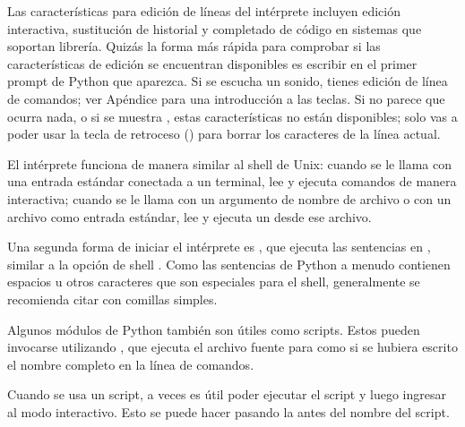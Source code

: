 \documentclass[a5paper,10pt,spanish]{sphinxmanual}
\begin{document}
\sphinxAtStartPar
Las características para edición de líneas del intérprete incluyen edición interactiva, sustitución de historial y completado de código en sistemas que soportan  librería. Quizás la forma más rápida para comprobar si las características de edición se encuentran disponibles es escribir  en el primer prompt de Python que aparezca. Si se escucha un sonido, tienes edición de línea de comandos; ver Apéndice {\hyperref[\detokenize{tutorial/interactive:tut-interacting}]{}} para una introducción a las teclas. Si no parece que ocurra nada, o si se muestra , estas características no están disponibles; solo vas a poder usar la tecla de retroceso () para borrar los caracteres de la línea actual.

\sphinxAtStartPar
El intérprete funciona de manera similar al shell de Unix: cuando se le llama con una entrada estándar conectada a un terminal, lee y ejecuta comandos de manera interactiva; cuando se le llama con un argumento de nombre de archivo o con un archivo como entrada estándar, lee y ejecuta un  desde ese archivo.

\sphinxAtStartPar
Una segunda forma de iniciar el intérprete es , que ejecuta las sentencias en , similar a la opción de shell  . Como las sentencias de Python a menudo contienen espacios u otros caracteres que son especiales para el shell, generalmente se recomienda citar  con comillas simples.

\sphinxAtStartPar
Algunos módulos de Python también son útiles como scripts. Estos pueden invocarse utilizando , que ejecuta el archivo fuente para  como si se hubiera escrito el nombre completo en la línea de comandos.

\sphinxAtStartPar
Cuando se usa un script, a veces es útil poder ejecutar el script y luego ingresar al modo interactivo. Esto se puede hacer pasando la  antes del nombre del script.
\end{document}
